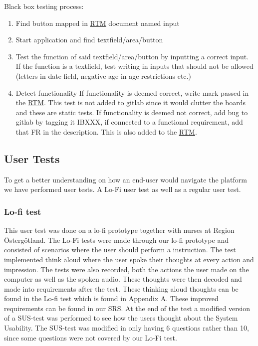 Black box testing process:

\begin{enumerate}
    \item Find button mapped in \href{https://gitlab.liu.se/tddc88-company-3-2020/deploy/-/tree/Document_branch/RTM}{\underline RTM} document named input
    \item Start application and find textfield/area/button
    \item Test the function of said textfield/area/button by inputting a correct input.
    \subitem If the function is a textfield, test writing in inputs that should not be allowed (letters in date field, negative age in age restrictions etc.)
    \item Detect functionality
    \subitem If functionality is deemed correct, write mark passed in the \href{https://gitlab.liu.se/tddc88-company-3-2020/deploy/-/tree/Document_branch/RTM}{\underline RTM}. This test is not added to gitlab since it would clutter the boards and these are static tests. 
    \subitem If functionality is deemed not correct, add bug to gitlab by tagging it IBXXX, if connected to a functional requirement, add that FR in the description. This is also added to the \href{https://gitlab.liu.se/tddc88-company-3-2020/deploy/-/tree/Document_branch/RTM}{\underline RTM}.
\end{enumerate}




\subsection{User Tests}
To get a better understanding on how an end-user would navigate the platform we have performed user tests. A Lo-Fi user test as well as a regular user test.

\subsubsection{Lo-fi test}
This user test was done on a lo-fi prototype together with nurses at Region Östergötland. The Lo-Fi tests were made through our lo-fi prototype and consisted of scenarios where the user should perform a instruction. The test implemented think aloud where the user spoke their thoughts at every action and impression. The tests were also recorded, both the actions the user made on the computer as well as the spoken audio. These thoughts were then decoded and made into requirements after the test. These thinking aloud thoughts can be found in the Lo-fi test which is found in Appendix A. These improved requirements can be found in our SRS. At the end of the test a modified version of a SUS-test was performed to see how the users thought about the System Usability. The SUS-test was modified in only having 6 questions rather than 10, since some questions were not covered by our Lo-Fi test.

